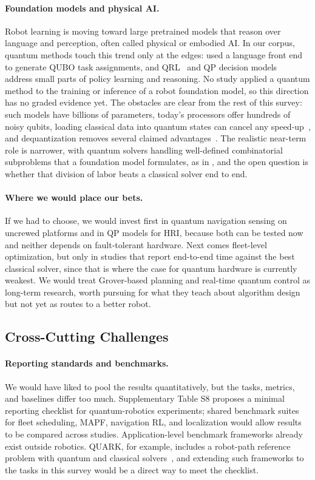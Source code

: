 \documentclass[acmsmall,screen,review]{acmart}
\begin{document}
\paragraph{Foundation models and physical AI.} Robot learning is moving toward large pretrained models that reason over language and perception, often called physical or embodied AI. In our corpus, quantum methods touch this trend only at the edges: \citet{Bang2026} used a language front end to generate QUBO task assignments, and QRL~\cite{Hohenfeld2024,Acuto2022} and QP decision models~\cite{Pothos2022} address small parts of policy learning and reasoning. No study applied a quantum method to the training or inference of a robot foundation model, so this direction has no graded evidence yet. The obstacles are clear from the rest of this survey: such models have billions of parameters, today's processors offer hundreds of noisy qubits, loading classical data into quantum states can cancel any speed-up~\cite{Aaronson2015}, and dequantization removes several claimed advantages~\cite{Tang2019}. The realistic near-term role is narrower, with quantum solvers handling well-defined combinatorial subproblems that a foundation model formulates, as in \citet{Bang2026}, and the open question is whether that division of labor beats a classical solver end to end.

\paragraph{Where we would place our bets.} If we had to choose, we would invest first in quantum navigation sensing on uncrewed platforms and in QP models for HRI, because both can be tested now and neither depends on fault-tolerant hardware. Next comes fleet-level optimization, but only in studies that report end-to-end time against the best classical solver, since that is where the case for quantum hardware is currently weakest. We would treat Grover-based planning and real-time quantum control as long-term research, worth pursuing for what they teach about algorithm design but not yet as routes to a better robot.


\subsection{Cross-Cutting Challenges}\label{sec:ch-cross}
\paragraph{Reporting standards and benchmarks.} We would have liked to pool the results quantitatively, but the tasks, metrics, and baselines differ too much. Supplementary Table S8 proposes a minimal reporting checklist for quantum-robotics experiments; shared benchmark suites for fleet scheduling, MAPF, navigation RL, and localization would allow results to be compared across studies. Application-level benchmark frameworks already exist outside robotics. QUARK, for example, includes a robot-path reference problem with quantum and classical solvers~\cite{Finzgar2022}, and extending such frameworks to the tasks in this survey would be a direct way to meet the checklist.
\end{document}
